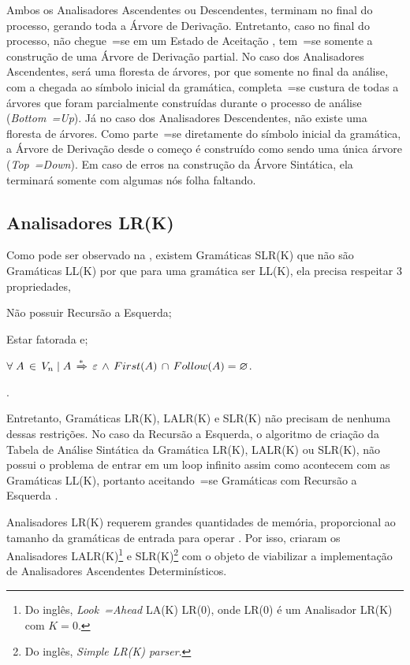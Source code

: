 Ambos os Analisadores Ascendentes ou
Descendentes,
terminam no final do processo,
gerando toda a Árvore de Derivação.
Entretanto,
caso no final do processo,
não chegue~=se em um Estado de Aceitação \cite{ahoCompilerDragonBook},
tem~=se somente a construção de uma Árvore de Derivação partial.
No caso dos Analisadores Ascendentes,
será uma floresta de árvores,
por que somente no final da análise,
com a chegada ao símbolo inicial da gramática,
completa~=se custura de todas a árvores que foram parcialmente construídas durante o processo de análise (\textit{Bottom~=Up}).
Já no caso dos Analisadores Descendentes,
não existe uma floresta de árvores.
Como parte~=se diretamente do símbolo inicial da gramática,
a Árvore de Derivação desde o começo é construído como sendo uma única árvore (\textit{Top~=Down}).
Em caso de erros na construção da Árvore Sintática,
ela terminará somente com algumas nós folha faltando.


\subsection{Analisadores LR(K)}

Como pode ser observado na ,
existem Gramáticas SLR(K) que não são Gramáticas LL(K) por que para uma gramática ser LL(K),
ela precisa respeitar 3 propriedades,
\begin{inparaenum}[1)]
    \item Não possuir Recursão a Esquerda;
    \item Estar fatorada e;
    \item $\forall\; A\, \in\, V_n\; |\; A\,
            \xRightarrow{*}\, \varepsilon\,
            \land\, First(A)\, \cap\, Follow(A) = \varnothing$.
\end{inparaenum}
\cite{ahoCompilerDragonBook}.

Entretanto,
Gramáticas LR(K), LALR(K) e
SLR(K) não precisam de nenhuma dessas restrições.
No caso da Recursão a Esquerda,
o algoritmo de criação da Tabela de Análise Sintática da Gramática LR(K),
LALR(K) ou SLR(K),
não possui o problema de entrar em um loop infinito assim como acontecem com as Gramáticas LL(K),
portanto aceitando~=se Gramáticas com Recursão a Esquerda \cite{ahoCompilerDragonBook}.

Analisadores LR(K) requerem grandes quantidades de memória,
proporcional ao tamanho da gramáticas de entrada para operar \cite{complexityOfLRKTesting}.
Por isso,
 criaram os Analisadores LALR(K)\footnote{
Do inglês, \textit{Look~=Ahead} LA(K) LR(0),
onde LR(0) é um Analisador LR(K) com $K=0$.
}
e SLR(K)\footnote{
Do inglês, \textit{Simple LR(K) parser}.
}
com o objeto de viabilizar a implementação de Analisadores Ascendentes Determinísticos.

